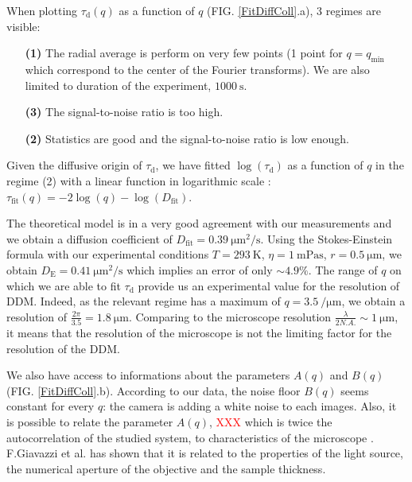 \documentclass[%
 aip,
 jmp,%
 amsmath,amssymb,
reprint,%
]{revtex4-1}
\begin{document}
When plotting $\tau_\text{d}(q)$ as a function of $q$ (FIG. \ref{FitDiffColl}.a), 3 regimes are visible:

\begin{itemize}
\item[\textbf{(1)}] The radial average is perform on very few points (1 point for $q = q_\text{min}$ which correspond to the center of the Fourier transforms). We are also limited to duration of the experiment, $\SI{1000}{\second}$.
\item[\textbf{(3)}] The signal-to-noise ratio is too high.
\item[\textbf{(2)}] Statistics are good and the signal-to-noise ratio is low enough.
\end{itemize}


Given the diffusive origin of $\tau_\text{d}$, we have fitted $\log(\tau_\text{d})$ as a function of $q$ in the regime (2) with a linear function in logarithmic scale : $\tau_\text{fit}(q) = -2\log(q) - \log(D_\text{fit})$. 



The theoretical model is in a very good agreement with our measurements and we obtain a diffusion coefficient of $D_\text{fit} = \SI{0.39}{\micro\meter\squared\per\second}$. Using the Stokes-Einstein formula with our experimental conditions $T = \SI{293}{\kelvin}$, $\eta = \SI{1}{\milli\pascal\second}$, $r = \SI{0.5}{\micro\meter}$, we obtain $D_\text{E} = \SI{0.41}{\micro\meter\squared\per\second}$ which implies an error of only $\sim 4.9 \%$. The range of $q$ on which we are able to fit $\tau_\text{d}$ provide us an experimental value for the resolution of DDM. Indeed, as the relevant regime has a maximum of $q=\SI{3.5}{\per\micro\meter}$, we obtain a resolution of $\frac{2\pi}{3.5} = \SI{1.8}{\micro\meter}$. Comparing to the microscope resolution $\frac{\lambda}{2 N.A.} \sim \SI{1}{\micro\meter}$, it means that the resolution of the microscope is not the limiting factor for the resolution of the DDM.

We also have access to informations about the parameters $A(q)$ and $B(q)$ (FIG. \ref{FitDiffColl}.b). According to our data, the noise floor $B(q)$ seems constant for every $q$: the camera is adding a white noise to each images. Also, it is possible to relate the parameter $A(q)$, \textcolor{red}{XXX} which is twice the autocorrelation of the studied system, to characteristics of the microscope \citep{3_DDM3D}. F.Giavazzi et al. has shown that it is related to the properties of the light source, the numerical aperture of the objective and the sample thickness.
\end{document}

